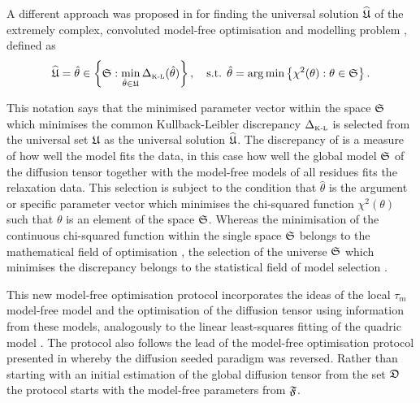 \begin{htmlonly}
\begin{htmlonly}
A different approach was proposed in \citet{dAuvergneGooley08b} for finding the universal solution $\widehat{\mathfrak{U}}$ of the extremely complex, convoluted model-free optimisation and modelling problem \citep{dAuvergneGooley07}, defined as
\begin{equation} \label{eq: universal solution}
 \widehat{\mathfrak{U}} = \hat\theta \in \left\{ \mathfrak{S}: \min_{\hat\theta \in \mathfrak{U}} \Delta_{\scriptscriptstyle \text{K-L}}(\hat\theta) \right\},
  \text{\quad s.t. }
  \hat\theta = \arg \min \left\{\chi^2(\theta): \theta \in \mathfrak{S} \right\}.
\end{equation}

\noindent This notation says that the minimised parameter vector within the space $\mathfrak{S}$ which minimises the common Kullback-Leibler discrepancy $\Delta_{\scriptscriptstyle \text{K-L}}$ is selected from the universal set $\mathfrak{U}$ as the universal solution $\widehat{\mathfrak{U}}$.
The discrepancy of \citet{KullbackLeibler51} is a measure of how well the model fits the data, in this case how well the global model $\mathfrak{S}$ of the diffusion tensor together with the model-free models of all residues fits the relaxation data.
This selection is subject to the condition that $\hat\theta$ is the argument or specific parameter vector which minimises the chi-squared function $\chi^2(\theta)$ such that $\theta$ is an element of the space $\mathfrak{S}$.
Whereas the minimisation of the continuous chi-squared function within the single space $\mathfrak{S}$ belongs to the mathematical field of optimisation \citep{NocedalWright99}, the selection of the universe $\mathfrak{S}$ which minimises the discrepancy belongs to the statistical field of model selection \citep{Akaike73,Schwarz78,LinhartZucchini86,Zucchini00,dAuvergneGooley03}.

This new model-free optimisation protocol incorporates the ideas of the local $\tau_m$ model-free model \citep{Barbato92, Schurr94} and the optimisation of the diffusion tensor using information from these models, analogously to the linear least-squares fitting of the quadric model \citep{Bruschweiler95, Lee97}.
The protocol also follows the lead of the model-free optimisation protocol presented in \citet{Butterwick04} whereby the diffusion seeded paradigm was reversed.
Rather than starting with an initial estimation of the global diffusion tensor from the set $\mathfrak{D}$ the protocol starts with the model-free parameters from $\mathfrak{F}$.


\end{htmlonly}
\end{htmlonly}
